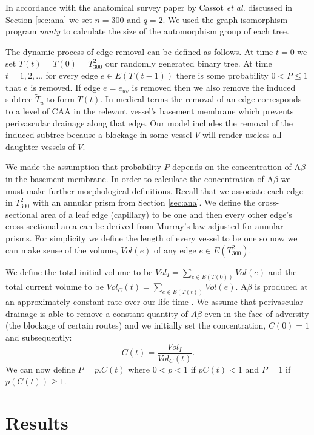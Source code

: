 \documentclass[12pt]{article} %
\theoremstyle{definition}
\begin{document}
In accordance with the anatomical survey paper by Cassot \emph{et al.} discussed in Section \ref{sec:ana} we set $n = 300$ and  $q=2$.  
We used the graph isomorphism program \emph{nauty} \cite{nauty} to calculate the size of the automorphism group of each tree.  

The dynamic process of edge removal can be defined as follows.  At time $t=0$ we set $T(t) = T(0) = T^{2}_{300}$ our randomly generated binary tree.  At time  $t = 1,2,\dots$ for every edge  $e \in E(T(t-1))$ there is some probability $0<P\leq 1$ that $e $ is removed.  If edge $e = e_{uv}$ is removed then we also remove the induced subtree $\tilde{T}_{u}$ to form $T(t)$.  In medical terms the removal of an edge corresponds to a level of CAA in the relevant vessel's basement membrane which prevents perivascular drainage along that edge.  Our model includes the removal of the induced subtree because a blockage in some vessel $V$ will render useless all daughter vessels of $V$.  

We made the assumption that probability $P$ depends on the concentration of A$\beta$ in the basement membrane. 
 In order to calculate the concentration of A$\beta$ we must make further morphological definitions.   Recall that we associate each edge in $T_{300}^{2}$ with an annular prism from Section \ref{sec:ana}.  We define the cross-sectional area of a leaf edge (capillary) to be one and then every other edge's cross-sectional area can be derived from Murray's law adjusted for annular prisms.  For simplicity we define the length of every vessel to be one so now we can make sense of the volume, $Vol(e)$ of any edge $e \in E(T_{300}^{2})$.

We define the total initial volume to be $Vol_{I} =  \sum_{e \in E(T(0))} Vol(e)$ and the total current volume to be $Vol_{C}(t) = \sum_{e \in E(T(t))} Vol(e)$.   A$\beta$ is produced at an approximately constant rate over our life time \cite{Weller}. 
We assume  that perivascular drainage is able to remove a constant quantity of $A\beta$ even in the face of adversity (the blockage of certain routes) 
and we initially set the concentration, $C(0) = 1$ and subsequently: 
\[C(t) = \frac{Vol_{I}}{Vol_{C}(t)}.\]
We can now define $P = p.C(t)$ where $0<p<1$ if $pC(t)<1$ and $P = 1$ if $p(C(t)) \geq 1$.     

 
\section{Results}  
\end{document}
